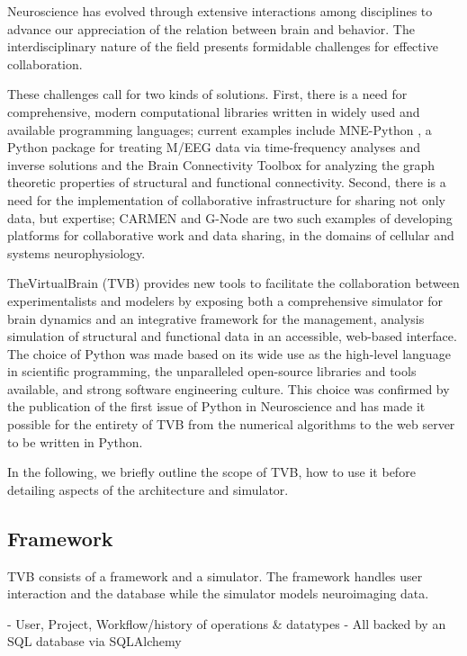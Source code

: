 \documentclass{bioinfo}
\begin{document}
Neuroscience has evolved through extensive interactions among disciplines
to advance our appreciation of the relation between brain and behavior.
The interdisciplinary nature of the field presents formidable challenges
for effective collaboration.

These challenges call for two kinds of solutions. First, there is a need for
comprehensive, modern computational libraries written in widely used and
available programming languages; current examples include MNE-Python
\citep{mnepython}, a Python package for treating M/EEG data via time-frequency
analyses and inverse solutions and the Brain Connectivity Toolbox
\citep{rubinov2010complex} for analyzing the graph theoretic properties of
structural and functional connectivity. Second, there is a need for the
implementation of collaborative infrastructure for sharing not only data, but
expertise; CARMEN \citep{austin2011carmen} and G-Node \citep{herz2008g} are two
such examples of developing platforms for collaborative work and data sharing,
in the domains of cellular and systems neurophysiology.

TheVirtualBrain (TVB) provides new tools to facilitate the collaboration
between experimentalists and modelers by exposing both a comprehensive
simulator for brain dynamics and an integrative framework for the management,
analysis simulation of structural and functional data in an accessible,
web-based interface. The choice of Python was made based on its wide use as the
high-level language in scientific programming, the unparalleled open-source
libraries and tools available, and strong software engineering culture.  This
choice was confirmed by the publication of the first issue of Python in
Neuroscience and has made it possible for the entirety of TVB from the
numerical algorithms to the web server to be written in Python.

In the following, we briefly outline the scope of TVB, how to use it before detailing
aspects of the architecture and simulator.

\subsection{Framework}

TVB consists of a framework and a simulator. The framework handles user
interaction and the database while the simulator models neuroimaging data. 

- User, Project, Workflow/history of operations \& datatypes
- All backed by an SQL database via SQLAlchemy
\end{document}
